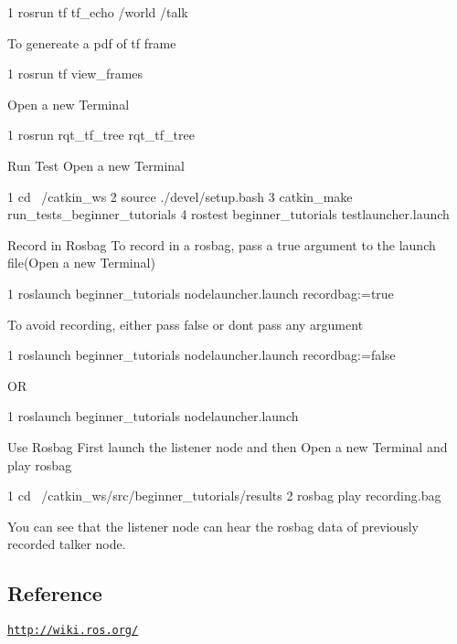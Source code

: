 \begin{DoxyCode}
1 rosrun tf tf\_echo /world /talk
\end{DoxyCode}
 To genereate a pdf of tf frame 
\begin{DoxyCode}
1 rosrun tf view\_frames
\end{DoxyCode}
 Open a new Terminal 
\begin{DoxyCode}
1 rosrun rqt\_tf\_tree rqt\_tf\_tree
\end{DoxyCode}



\begin{DoxyEnumerate}
\item Run Test Open a new Terminal 
\begin{DoxyCode}
1 cd ~/catkin\_ws
2 source ./devel/setup.bash
3 catkin\_make run\_tests\_beginner\_tutorials
4 rostest beginner\_tutorials testlauncher.launch
\end{DoxyCode}

\item Record in Rosbag To record in a rosbag, pass a true argument to the launch file(\+Open a new Terminal) 
\begin{DoxyCode}
1 roslaunch beginner\_tutorials nodelauncher.launch recordbag:=true
\end{DoxyCode}
 To avoid recording, either pass false or don\textquotesingle{}t pass any argument 
\begin{DoxyCode}
1 roslaunch beginner\_tutorials nodelauncher.launch recordbag:=false
\end{DoxyCode}
 OR 
\begin{DoxyCode}
1 roslaunch beginner\_tutorials nodelauncher.launch
\end{DoxyCode}

\item Use Rosbag First launch the listener node and then Open a new Terminal and play rosbag 
\begin{DoxyCode}
1 cd ~/catkin\_ws/src/beginner\_tutorials/results
2 rosbag play recording.bag
\end{DoxyCode}
 You can see that the listener node can hear the rosbag data of previously recorded talker node.
\end{DoxyEnumerate}

\subsection*{Reference}


\begin{DoxyItemize}
\item \href{http://wiki.ros.org/}{\tt http\+://wiki.\+ros.\+org/} 
\end{DoxyItemize}